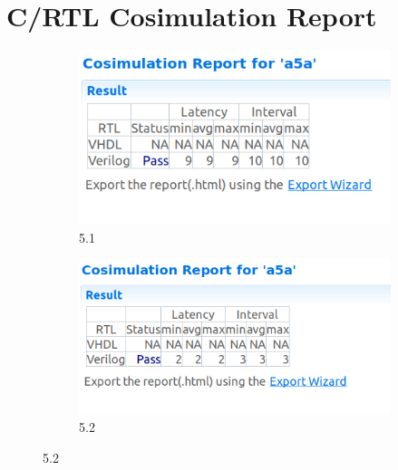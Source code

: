 \documentclass{article}
\begin{document}
\section{C/RTL Cosimulation Report}
\vspace{1cm}
\begin{figure}[h]
\centering
\begin{subfigure}[b]{0.8\textwidth}
    \centering
\includegraphics[width=\textwidth]{figs/34a.png}
    \caption{5.1}
    \label{fig:my_label}
\end{subfigure}
\hfill
\begin{subfigure}[b]{0.8\textwidth}
    \centering
\includegraphics[width=\textwidth]{figs/34b.png}
    \caption{5.2}
    \label{fig:my_label}
\end{subfigure}
\end{figure}

\vspace{5cm}
\end{document}
